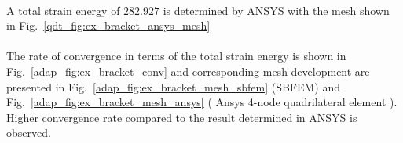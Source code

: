 \paragraph{}
A total strain energy of $282.927$ is determined by ANSYS with the mesh shown in Fig.~\ref{qdt_fig:ex_bracket_ansys_mesh}












\paragraph{}
The rate of convergence in terms of the total strain energy is shown in Fig.~\ref{adap_fig:ex_bracket_conv} and corresponding mesh development are presented in Fig.~\ref{adap_fig:ex_bracket_mesh_sbfem} (SBFEM) and Fig.~\ref{adap_fig:ex_bracket_mesh_ansys} ( Ansys 4-node quadrilateral element ).
Higher convergence rate compared to the result determined in ANSYS is observed.

